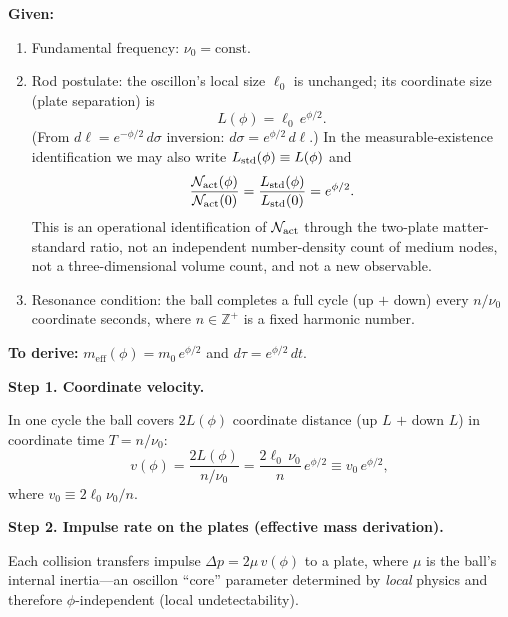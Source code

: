 \documentclass[11pt]{article}
\begin{document}
\textbf{Given:}
\begin{enumerate}
  \item Fundamental frequency: $\nu_0 = \mathrm{const}$.
  \item Rod postulate: the oscillon's local size $\ell_0$ is
    unchanged; its coordinate size (plate separation) is
    \begin{equation}
      L(\phi) = \ell_0\,e^{\phi/2}.
      \label{eq:L_phi}
    \end{equation}
    (From $d\ell = e^{-\phi/2}\,d\sigma$ inversion:
    $d\sigma = e^{\phi/2}\,d\ell$.)
    In the measurable-existence identification we may also write
    $L_{\rm std}(\phi)\equiv L(\phi)$ and
    \begin{equation}
      \frac{\mathcal N_{\rm act}(\phi)}
           {\mathcal N_{\rm act}(0)}
      =
      \frac{L_{\rm std}(\phi)}{L_{\rm std}(0)}
      = e^{\phi/2}.
      \label{eq:Nact_two_plate}
    \end{equation}
    This is an operational identification of $\mathcal N_{\rm act}$ through
    the two-plate matter-standard ratio, not an independent number-density
    count of medium nodes, not a three-dimensional volume count, and not a
    new observable.
  \item Resonance condition: the ball completes a full cycle (up $+$
    down) every $n/\nu_0$ coordinate seconds, where
    $n \in \mathbb{Z}^{+}$ is a fixed harmonic number.
\end{enumerate}

\textbf{To derive:}
$m_{\mathrm{eff}}(\phi) = m_0\,e^{\phi/2}$
and $d\tau = e^{\phi/2}\,dt$.

\bigskip
\textbf{Step 1. Coordinate velocity.}

In one cycle the ball covers $2L(\phi)$ coordinate distance
(up $L$ $+$ down $L$) in coordinate time $T = n/\nu_0$:
\begin{equation}
  v(\phi) = \frac{2L(\phi)}{n/\nu_0}
  = \frac{2\ell_0\,\nu_0}{n}\,e^{\phi/2}
  \equiv v_0\,e^{\phi/2},
  \label{eq:v_phi}
\end{equation}
where $v_0 \equiv 2\ell_0\nu_0/n$.

\bigskip
\textbf{Step 2. Impulse rate on the plates (effective mass
  derivation).}

Each collision transfers impulse $\Delta p = 2\mu\,v(\phi)$ to a
plate, where $\mu$ is the ball's internal inertia---an oscillon
``core'' parameter determined by \emph{local} physics and therefore
$\phi$-independent (local undetectability).
\end{document}
